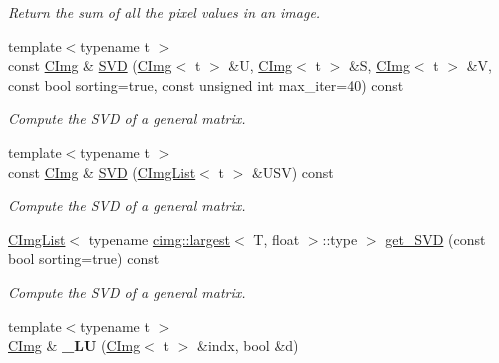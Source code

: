 \begin{DoxyCompactItemize}
\begin{DoxyCompactList}\small\item\em Return the sum of all the pixel values in an image. \item\end{DoxyCompactList}\item 
\hypertarget{structcimg__library_1_1_c_img_a8d9fd391d717afa541203fe2e530c60e}{
{\footnotesize template$<$typename t $>$ }\\const \hyperlink{structcimg__library_1_1_c_img}{CImg} \& \hyperlink{structcimg__library_1_1_c_img_a8d9fd391d717afa541203fe2e530c60e}{SVD} (\hyperlink{structcimg__library_1_1_c_img}{CImg}$<$ t $>$ \&U, \hyperlink{structcimg__library_1_1_c_img}{CImg}$<$ t $>$ \&S, \hyperlink{structcimg__library_1_1_c_img}{CImg}$<$ t $>$ \&V, const bool sorting=true, const unsigned int max\_\-iter=40) const }
\label{structcimg__library_1_1_c_img_a8d9fd391d717afa541203fe2e530c60e}

\begin{DoxyCompactList}\small\item\em Compute the SVD of a general matrix. \item\end{DoxyCompactList}\item 
\hypertarget{structcimg__library_1_1_c_img_a6e6d25c3402562ee5bdf193f3a64b140}{
{\footnotesize template$<$typename t $>$ }\\const \hyperlink{structcimg__library_1_1_c_img}{CImg} \& \hyperlink{structcimg__library_1_1_c_img_a6e6d25c3402562ee5bdf193f3a64b140}{SVD} (\hyperlink{structcimg__library_1_1_c_img_list}{CImgList}$<$ t $>$ \&USV) const }
\label{structcimg__library_1_1_c_img_a6e6d25c3402562ee5bdf193f3a64b140}

\begin{DoxyCompactList}\small\item\em Compute the SVD of a general matrix. \item\end{DoxyCompactList}\item 
\hypertarget{structcimg__library_1_1_c_img_a192e6eb3e62ef11af7eb91d4b787699f}{
\hyperlink{structcimg__library_1_1_c_img_list}{CImgList}$<$ typename \hyperlink{structcimg__library_1_1cimg_1_1largest}{cimg::largest}$<$ T, float $>$::type $>$ \hyperlink{structcimg__library_1_1_c_img_a192e6eb3e62ef11af7eb91d4b787699f}{get\_\-SVD} (const bool sorting=true) const }
\label{structcimg__library_1_1_c_img_a192e6eb3e62ef11af7eb91d4b787699f}

\begin{DoxyCompactList}\small\item\em Compute the SVD of a general matrix. \item\end{DoxyCompactList}\item 
\hypertarget{structcimg__library_1_1_c_img_a6667a04684fa491803f1b7a1e22b235b}{
{\footnotesize template$<$typename t $>$ }\\\hyperlink{structcimg__library_1_1_c_img}{CImg} \& {\bfseries \_\-LU} (\hyperlink{structcimg__library_1_1_c_img}{CImg}$<$ t $>$ \&indx, bool \&d)}
\label{structcimg__library_1_1_c_img_a6667a04684fa491803f1b7a1e22b235b}


\end{DoxyCompactItemize}

